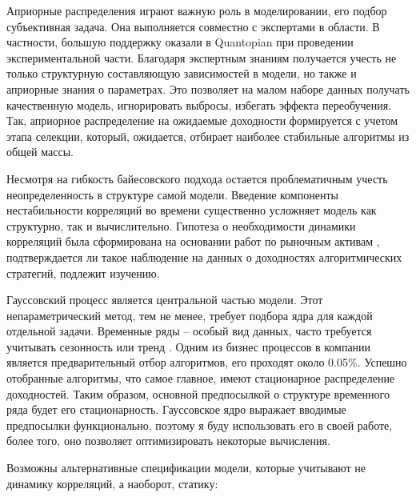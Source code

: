 Априорные распределения играют важную роль в моделировании, его подбор субъективная задача. Она выполняется совместно с экспертами в области. В частности, большую поддержку оказали в Quantopian при проведении экспериментальной части. Благодаря экспертным знаниям получается учесть не только структурную составляющую зависимостей в модели, но также и априорные знания о параметрах. Это позволяет на малом наборе данных получать качественную модель, игнорировать выбросы, избегать эффекта переобучения. Так, априорное распределение на ожидаемые доходности формируется с учетом этапа селекции, который, ожидается, отбирает наиболее стабильные алгоритмы из общей массы.

Несмотря на гибкость байесовского подхода остается проблематичным учесть неопределенность в структуре самой модели. Введение компоненты нестабильности корреляций во времени существенно усложняет модель как структурно, так и вычислительно. Гипотеза о необходимости динамики корреляций была сформирована на основании работ по рыночным активам \citep{vaga1990, oral2017}, подтверждается ли такое наблюдение на данных о доходностях алгоритмических стратегий, подлежит изучению.

Гауссовский процесс является центральной частью модели. Этот непараметрический метод, тем не менее, требует подбора ядра для каждой отдельной задачи. Временные ряды -- особый вид данных, часто требуется учитывать сезонность или тренд \citep{taylor2017}. Одним из бизнес процессов в компании является предварительный отбор алгоритмов, его проходят около 0.05\%. Успешно отобранные алгоритмы, что самое главное, имеют стационарное распределение доходностей. Таким образом, основной предпосылкой о структуре временного ряда будет его стационарность. Гауссовское ядро выражает вводимые предпосылки функционально, поэтому я буду использовать его в своей работе, более того, оно позволяет оптимизировать некоторые вычисления. 

Возможны альтернативные спецификации модели, которые учитывают не динамику корреляций, а наоборот, статику:
